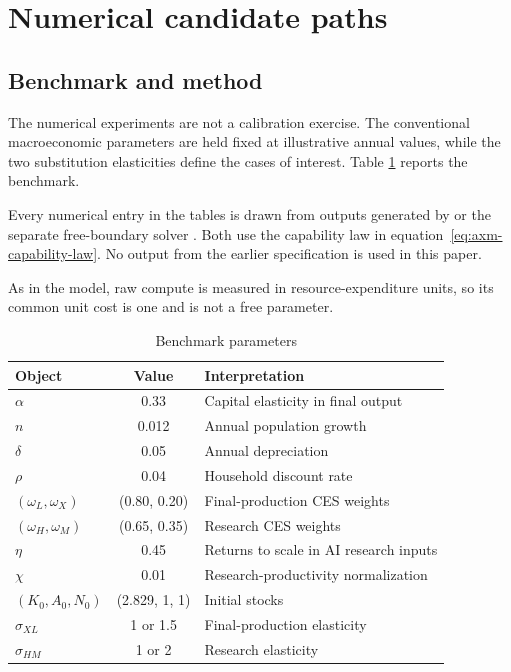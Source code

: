 \section{Numerical candidate paths}

\subsection{Benchmark and method}

The numerical experiments are not a calibration exercise. The conventional
macroeconomic parameters are held fixed at illustrative annual values, while the
two substitution elasticities define the cases of interest. Table
\ref{tab:axm-parameters} reports the benchmark.

Every numerical entry in the tables is drawn from outputs generated by
 or the separate free-boundary solver
. Both use the capability
law in equation~\eqref{eq:axm-capability-law}. No output from the earlier
specification is used in this paper.

As in the model, raw compute is measured in resource-expenditure units, so its
common unit cost is one and is not a free parameter.

\begin{table}[H]
\centering
\caption{Benchmark parameters}
\label{tab:axm-parameters}
\begin{tabular}{lcl}
\toprule
Object & Value & Interpretation\\
\midrule
\(\alpha\) & 0.33 & Capital elasticity in final output\\
\(n\) & 0.012 & Annual population growth\\
\(\delta\) & 0.05 & Annual depreciation\\
\(\rho\) & 0.04 & Household discount rate\\
\((\omega_L,\omega_X)\) & (0.80, 0.20) & Final-production CES weights\\
\((\omega_H,\omega_M)\) & (0.65, 0.35) & Research CES weights\\
\(\eta\) & 0.45 & Returns to scale in AI research inputs\\
\(\chi\) & 0.01 & Research-productivity normalization\\
\((K_0,A_0,N_0)\) & (2.829, 1, 1) & Initial stocks\\
\(\sigma_{XL}\) & 1 or 1.5 & Final-production elasticity\\
\(\sigma_{HM}\) & 1 or 2 & Research elasticity\\
\bottomrule
\end{tabular}
\end{table}

